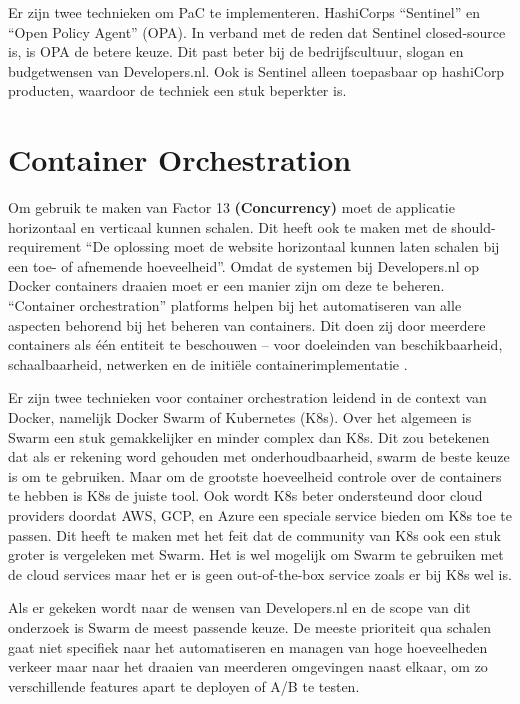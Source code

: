 Er zijn twee technieken om PaC te implementeren. HashiCorps \enquote{Sentinel} en \enquote{Open Policy Agent} (OPA). In verband met de reden dat Sentinel closed-source is, is OPA de betere keuze. Dit past beter bij de bedrijfscultuur, slogan en budgetwensen van Developers.nl. Ook is Sentinel alleen toepasbaar op hashiCorp producten, waardoor de techniek een stuk beperkter is.

\section{Container Orchestration}
\label{ContainerOrchestration}
Om gebruik te maken van Factor 13 \textbf{(Concurrency)} moet de applicatie horizontaal en verticaal kunnen schalen. Dit heeft ook te maken met de should-requirement \enquote{De oplossing moet de website horizontaal kunnen laten schalen bij een toe- of afnemende hoeveelheid}. Omdat de systemen bij Developers.nl op Docker containers draaien moet er een manier zijn om deze te beheren. \enquote{Container orchestration} platforms helpen bij het automatiseren van alle aspecten behorend bij het beheren van containers. Dit doen zij door meerdere containers als één entiteit te beschouwen -- voor doeleinden van beschikbaarheid, schaalbaarheid, netwerken en de initiële containerimplementatie \parencite{ContainerOrchestration}.

Er zijn twee technieken voor container orchestration leidend in de context van Docker, namelijk Docker Swarm of Kubernetes (K8s). Over het algemeen is Swarm een stuk gemakkelijker en minder complex dan K8s. Dit zou betekenen dat als er rekening word gehouden met onderhoudbaarheid, swarm de beste keuze is om te gebruiken. Maar om de grootste hoeveelheid controle over de containers te hebben is K8s de juiste tool. Ook wordt K8s beter ondersteund door cloud providers doordat AWS, GCP, en Azure een speciale service bieden om K8s toe te passen. Dit heeft te maken met het feit dat de community van K8s ook een stuk groter is vergeleken met Swarm. Het is wel mogelijk om Swarm te gebruiken met de cloud services maar het er is geen out-of-the-box service zoals er bij K8s wel is. 

Als er gekeken wordt naar de wensen van Developers.nl en de scope van dit onderzoek is Swarm de meest passende keuze. De meeste prioriteit qua schalen gaat niet specifiek naar het automatiseren en managen van hoge hoeveelheden verkeer maar naar het draaien van meerderen omgevingen naast elkaar, om zo verschillende features apart te deployen of A/B te testen.

